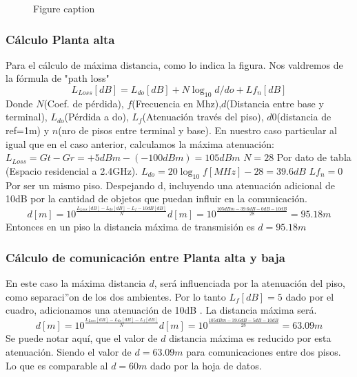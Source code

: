 \documentclass[preprint,12pt]{elsarticle}
\begin{document}
\begin{figure}[h]
\caption{Figure caption}
\end{figure}

\subsubsection{C\'alculo Planta alta}
Para el c\'alculo de m\'axima distancia, como lo indica la figura. Nos valdremos de la f\'ormula de "path loss"\cite{bilb:PathLoss}
\begin{equation*}
\label{eq:pathLoss}
L_{Loss}[dB] = L_{do}[dB] + N \log_{10}d/do + Lf_{n}[dB]
\end{equation*}
Donde $N$(Coef. de p\'erdida), $f$(Frecuencia en Mhz),$d$(Distancia entre base y terminal), $L_{do}$(P\'erdida a do), $L_{f}$(Atenuaci\'on trav\'es del piso), $d0$(distancia de ref=1m) y $n$(nro de pisos entre terminal y base).
En nuestro caso particular al igual que en el caso anterior, calculamos la m\'axima atenuaci\'on:
$L_{Loss}= Gt - Gr = +5dBm - (-100dBm) = 105dBm$
$N=28$ Por dato de tabla \cite{bilb:Tabla}(Espacio residencial a 2.4GHz).
$L_{do} = 20 \log_{10}f[MHz] - 28 = 39.6dB$
$Lf_{n} = 0$ Por ser un mismo piso.
Despejando d, incluyendo una atenuaci\'on adicional de 10dB por la cantidad de objetos que puedan influir en la comunicaci\'on.
\begin{equation*}
\label{eq:calculod}
d[m] = 10 ^{\frac{L_{Loss}[dB] - L_{do}[dB] - L_{f}-10dB[dB]}{N}} 
d[m] = 10 ^{\frac{105dBm - 39.6dB - 0dB - 10dB}{28}} = 95.18m
\end{equation*}
Entonces en un piso la distancia m\'axima de transmisi\'on es $d=95.18m$

\subsubsection{C\'alculo de comunicaci\'on entre Planta alta y baja}
En este caso la m\'axima distancia $d$, ser\'a influenciada por la atenuaci\'on del piso, como separaci''on de los dos ambientes. Por lo tanto $L_{f}[dB]=5$ dado por el cuadro, adicionamos una atenuaci\'on de 10dB . La distancia m\'axima ser\'a.
\begin{equation*}
\label{eq:calculod}
d[m] = 10 ^{\frac{L_{Loss}[dB] - L_{do}[dB] - L_{f}[dB]}{N}} 
d[m] = 10 ^{\frac{105dBm - 39.6dB - 5dB -10dB}{28}} = 63.09m
\end{equation*}
Se puede notar aqu\'i, que el valor de $d$ distancia m\'axima es reducido por esta atenuaci\'on. Siendo el valor de $d=63.09m$ para comunicaciones entre dos pisos. Lo que es comparable al $d=60m$ dado por la hoja de datos.
\end{document}
